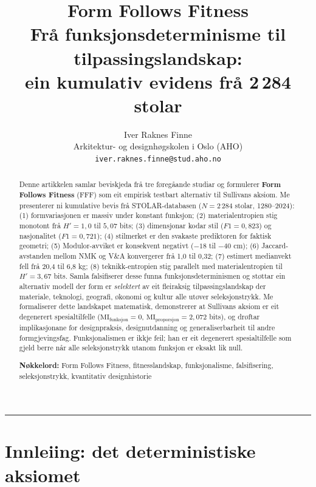 \documentclass[10pt, a4paper, twocolumn]{article}
\title{%
  \textbf{Form Follows Fitness}\\[0.4em]
  \large Frå funksjonsdeterminisme til tilpassingslandskap:\\
  ein kumulativ evidens frå 2\,284 stolar%
}
\author{%
  Iver Raknes Finne\\
  \small Arkitektur- og designhøgskolen i Oslo (AHO)\\
  \small \texttt{iver.raknes.finne@stud.aho.no}
}
\date{}
\begin{document}
\maketitle

\begin{abstract}
\noindent Denne artikkelen samlar beviskjeda frå tre føregåande studiar og formulerer \textbf{Form Follows Fitness} (FFF) som eit empirisk testbart alternativ til Sullivans aksiom. Me presenterer ni kumulative bevis frå STOLAR-databasen ($N = 2\,284$ stolar, 1280--2024): (1) formvariasjonen er massiv under konstant funksjon; (2) materialentropien stig monotont frå $H' = 1{,}0$ til $5{,}07$ bits; (3) dimensjonar kodar stil ($F1 = 0{,}823$) og nasjonalitet ($F1 = 0{,}721$); (4) stilmerket er den svakaste prediktoren for faktisk geometri; (5) Modulor-avviket er konsekvent negativt ($-18$ til $-40$ cm); (6) Jaccard-avstanden mellom NMK og V\&A konvergerer frå 1,0 til 0,32; (7) estimert medianvekt fell frå 20,4 til 6,8 kg; (8) teknikk-entropien stig parallelt med materialentropien til $H' = 3{,}67$ bits. Samla falsifiserer desse funna funksjonsdeterminismen og støttar ein alternativ modell der form er \emph{selektert} av eit fleiraksig tilpassingslandskap der materiale, teknologi, geografi, økonomi og kultur alle utøver seleksjonstrykk. Me formaliserer dette landskapet matematisk, demonstrerer at Sullivans aksiom er eit degenerert spesialtilfelle ($\text{MI}_{\text{funksjon}} = 0$, $\text{MI}_{\text{proporsjon}} = 2{,}072$ bits), og drøftar implikasjonane for designpraksis, designutdanning og generaliserbarheit til andre formgjevingsfag. Funksjonalismen er ikkje feil; han er eit degenerert spesialtilfelle som gjeld berre når alle seleksjonstrykk utanom funksjon er eksakt lik null.

\medskip
\noindent\textbf{Nøkkelord:} Form Follows Fitness, fitnesslandskap, funksjonalisme, falsifisering, seleksjonstrykk, kvantitativ designhistorie
\end{abstract}

\vspace{1em}
\hrule
\vspace{1.5em}


\section{Innleiing: det deterministiske aksiomet}
\end{document}
